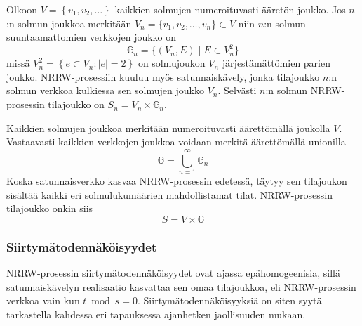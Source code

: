 \documentclass[finnish, 12pt, a4paper, sci, utf8, pdfa]{aaltothesis}
\begin{document}
Olkoon $ V = \left\{ v_{1}, v_{2}, \ldots \right\} $ kaikkien solmujen numeroituvasti ääretön joukko. Jos $ n $:n solmun joukkoa merkitään $ V_{n} = \{ v_{1}, v_{2}, \ldots , v_{n} \} \subset V $ niin $ n $:n solmun suuntaamattomien verkkojen joukko on
\[
   \mathbb{G}_{n} = \{ (V_{n}, E) \mid E \subset V_{n}^{2}  \}
\]
missä $ V_{n}^{2} = \left\{ e \subset V_{n} : |e| = 2 \right\} $ on solmujoukon $ V_{n} $ järjestämättömien parien joukko. NRRW-prosessiin kuuluu myös satunnaiskävely, jonka tilajoukko $ n $:n solmun verkkoa kulkiessa sen solmujen joukko $ V_{n} $. Selvästi $ n $:n solmun NRRW-prosessin tilajoukko on $ S_{n} = V_{n} \times \mathbb{G}_{n} $.

Kaikkien solmujen joukkoa merkitään numeroituvasti äärettömällä joukolla $ V $. Vastaavasti kaikkien verkkojen joukkoa voidaan merkitä äärettömällä unionilla
\begin{equation}
   \mathbb{G} = \bigcup_{n = 1}^{\infty} \mathbb{G}_{n}
\end{equation}
Koska satunnaisverkko kasvaa NRRW-prosessin edetessä, täytyy sen tilajoukon sisältää kaikki eri solmulukumäärien mahdollistamat tilat. NRRW-prosessin tilajoukko onkin siis
\begin{equation}
   S = V \times \mathbb{G}
   \label{equation:tilajoukko}
\end{equation}

\subsubsection{Siirtymätodennäköisyydet}

NRRW-prosessin siirtymätodennäköisyydet ovat ajassa epähomogeenisia, sillä satunnaiskävelyn realisaatio kasvattaa sen omaa tilajoukkoa, eli NRRW-prosessin verkkoa vain kun $ t \bmod s = 0 $. Siirtymätodennäköisyyksiä on siten syytä tarkastella kahdessa eri tapauksessa ajanhetken jaollisuuden mukaan. 
\end{document}

